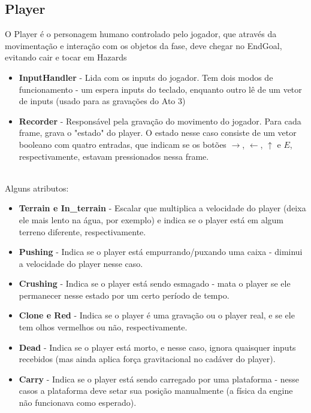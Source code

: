 \documentclass[a4paper, 11pt]{article}
\begin{document}
		\subsection{Player}
			O Player é o personagem humano controlado pelo jogador, que através da movimentação e interação com os objetos da fase, deve chegar no EndGoal, evitando cair e  tocar em Hazards
			\begin{itemize}
				\item \textbf{InputHandler} - Lida com os inputs do jogador. Tem dois modos de funcionamento - um espera inputs do teclado, enquanto outro lê de um vetor de inputs (usado para as gravações do Ato 3)
				\item \textbf{Recorder} - Responsável pela gravação do movimento do jogador. Para cada frame, grava o "estado" do player. O estado nesse caso consiste de um vetor booleano com quatro entradas, que indicam se os botões $\rightarrow$, $\leftarrow$, $\uparrow$ e $E$, respectivamente, estavam pressionados nessa frame.
			\end{itemize}
			\\
			Alguns atributos:
			\begin{itemize}
				\item \textbf{Terrain e In\_terrain} - Escalar que multiplica a velocidade do player (deixa ele mais lento na água, por exemplo) e indica se o player está em algum terreno diferente, respectivamente.
				\item \textbf{Pushing} - Indica se o player está empurrando/puxando uma caixa - diminui a velocidade do player nesse caso.
				\item \textbf{Crushing} - Indica se o player está sendo esmagado - mata o player se ele permanecer nesse estado por um certo período de tempo.
				\item \textbf{Clone e Red} - Indica se o player é uma gravação ou o player real, e se ele tem olhos vermelhos ou não, respectivamente.
				\item \textbf{Dead} - Indica se o player está morto, e nesse caso, ignora quaisquer inputs recebidos (mas ainda aplica força gravitacional no cadáver do player).
				\item \textbf{Carry} - Indica se o player está sendo carregado por uma plataforma - nesse casos a plataforma deve setar sua posição manualmente (a física da engine não funcionava como esperado).
			\end{itemize}
\end{document}

